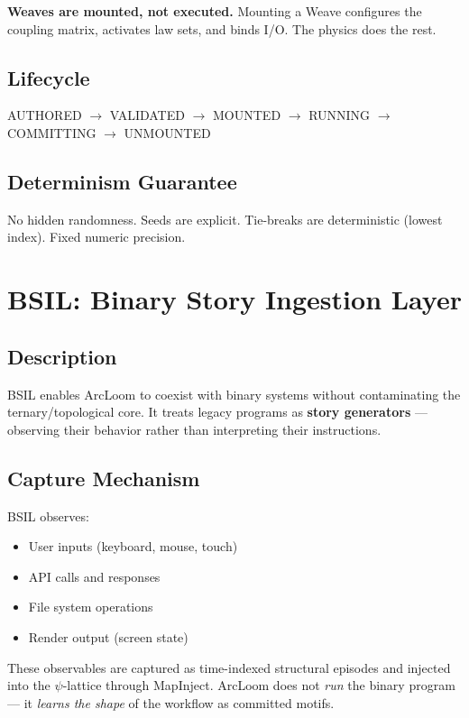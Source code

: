 \documentclass[11pt, a4paper]{report}
\begin{document}
\textbf{Weaves are mounted, not executed.} Mounting a Weave configures
the coupling matrix, activates law sets, and binds I/O. The physics does
the rest.

\section{Lifecycle}

\begin{center}
AUTHORED $\to$ VALIDATED $\to$ MOUNTED $\to$ RUNNING $\to$ COMMITTING $\to$ UNMOUNTED
\end{center}

\section{Determinism Guarantee}

No hidden randomness. Seeds are explicit. Tie-breaks are deterministic
(lowest index). Fixed numeric precision.

\chapter{BSIL: Binary Story Ingestion Layer}

\section{Description}

BSIL enables ArcLoom to coexist with binary systems without contaminating
the ternary/topological core. It treats legacy programs as \textbf{story
generators} --- observing their behavior rather than interpreting their
instructions.

\section{Capture Mechanism}

BSIL observes:
\begin{itemize}[nosep]
  \item User inputs (keyboard, mouse, touch)
  \item API calls and responses
  \item File system operations
  \item Render output (screen state)
\end{itemize}

These observables are captured as time-indexed structural episodes and
injected into the $\psi$-lattice through MapInject. ArcLoom does not
\textit{run} the binary program --- it \textit{learns the shape} of the
workflow as committed motifs.
\end{document}

